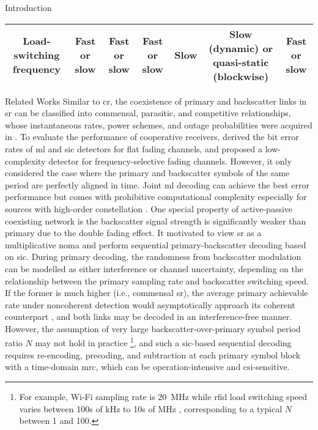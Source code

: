 \documentclass[journal]{IEEEtran}
\begin{document}
\begin{section}{Introduction}
\begin{table*}[]
\begin{tabularx}{\textwidth}{CCCCCCC}
			Load-switching frequency      & Fast or slow              & Fast or slow              & Fast or slow                                    & Slow                                         & Slow (dynamic) or quasi-static (blockwise) & Fast or slow                                      \\ \bottomrule
		\end{tabularx}
	\end{table*}

	\begin{subsection}{Related Works}
		Similar to \gls{cr}, the coexistence of primary and backscatter links in \gls{sr} can be classified into commensal, parasitic, and competitive relationships, whose instantaneous rates, power schemes, and outage probabilities were acquired in \cite{Guo2019b,Ding2020}.
		To evaluate the performance of cooperative receivers, \cite{Yang2018} derived the bit error rates of \gls{ml} and \gls{sic} detectors for flat fading channels, and proposed a low-complexity detector for frequency-selective fading channels.
		However, it only considered the case where the primary and backscatter symbols of the same period are perfectly aligned in time.
		Joint \gls{ml} decoding can achieve the best error performance but comes with prohibitive computational complexity especially for sources with high-order constellation \cite{Yang2018,Liang2020,Zhang2022}.
		One special property of active-passive coexisting network is the backscatter signal strength is significantly weaker than primary due to the double fading effect.
		It motivated \cite{Long2020a,Liang2020,Guo2019b,Ding2020,Zhou2019a,Wu2021a,Xu2021a,Yang2021a,Yang2018,Han2021,Zhang2022} to view \gls{sr} as a multiplicative \gls{noma} and perform sequential primary-backscatter decoding based on \gls{sic}.
		During primary decoding, the randomness from backscatter modulation can be modelled as either interference or channel uncertainty, depending on the relationship between the primary sampling rate and backscatter switching speed.
		If the former is much higher (i.e., commensal \gls{sr}), the average primary achievable rate under noncoherent detection would asymptotically approach its coherent counterpart \cite{Long2020a}, and both links may be decoded in an interference-free manner.
		However, the assumption of very large backscatter-over-primary symbol period ratio $N$ may not hold in practice \footnote{For example, Wi-Fi sampling rate is \qty{20}{\MHz} while \gls{rfid} load switching speed varies between \num{100}s of \unit{\kHz} to \num{10}s of \unit{\MHz} \cite{Torres2021}, corresponding to a typical $N$ between \num{1} and \num{100}.}, and such a \gls{sic}-based sequential decoding requires re-encoding, precoding, and subtraction at each primary symbol block with a time-domain \gls{mrc}, which can be operation-intensive and \gls{csi}-sensitive.

\end{subsection}
\end{section}
\end{document}

